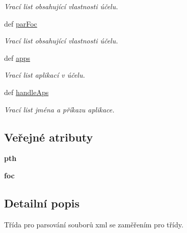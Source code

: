 \begin{DoxyCompactItemize}
\begin{DoxyCompactList}\small\item\em Vrací list obsahující vlastnosti účelu. \end{DoxyCompactList}\item 
def \hyperlink{classxmlFocPar_1_1xmlFocPar_acb64fb8d791eea8f81d3519d9cb05377}{par\-Foc}
\begin{DoxyCompactList}\small\item\em Vrací list obsahující vlastnosti účelu. \end{DoxyCompactList}\item 
def \hyperlink{classxmlFocPar_1_1xmlFocPar_a7bbeae70c79068740e0a933ca90fc887}{apps}
\begin{DoxyCompactList}\small\item\em Vrací list aplikací v účelu. \end{DoxyCompactList}\item 
def \hyperlink{classxmlFocPar_1_1xmlFocPar_a664f281540faa32cb196484a9cb2bfeb}{handle\-Aps}
\begin{DoxyCompactList}\small\item\em Vrací list jména a příkazu aplikace. \end{DoxyCompactList}\end{DoxyCompactItemize}
\subsection*{Veřejné atributy}
\begin{DoxyCompactItemize}
\item 
\hypertarget{classxmlFocPar_1_1xmlFocPar_ac86f256da6384fe1ed5ae182de266bcf}{{\bfseries pth}}\label{db/ddc/classxmlFocPar_1_1xmlFocPar_ac86f256da6384fe1ed5ae182de266bcf}

\item 
\hypertarget{classxmlFocPar_1_1xmlFocPar_a7b380693eaa7349801d24cf74675a934}{{\bfseries foc}}\label{db/ddc/classxmlFocPar_1_1xmlFocPar_a7b380693eaa7349801d24cf74675a934}

\end{DoxyCompactItemize}


\subsection{Detailní popis}
Třída pro parsování souborů xml se zaměřením pro třídy. 

